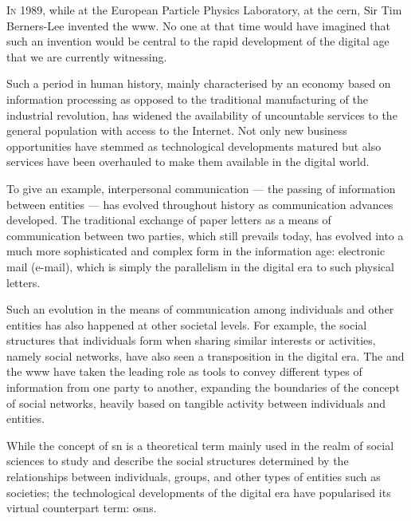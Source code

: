 

\lettrine{\textcolor[gray]{.25}{I}}{n} 1989, while at the European Particle Physics 
Laboratory, at the \acf{cern}, Sir Tim Berners-Lee invented the \Ac{www}. No one 
at that time would have imagined that such an invention would be central to the rapid 
development of the digital age that we are currently witnessing.

Such a period in human history, mainly characterised by an economy based on information 
processing as opposed to the traditional manufacturing of the industrial revolution, 
has widened the availability of uncountable services to the general population with 
access to the Internet. Not only new business opportunities have stemmed as technological 
developments matured but also services have been overhauled to make them available 
in the digital world.

To give an example, interpersonal communication --- the passing of information between 
entities --- has evolved throughout history as communication advances developed. 
The traditional exchange of paper letters as a means of communication between two 
parties, which still prevails today, has evolved into a much more sophisticated 
and complex form in the information age: electronic mail (e-mail), which is simply 
the parallelism in the digital era to such physical letters.

Such an evolution in the means of communication among individuals and other entities 
has also happened at other societal levels. For example, the social structures that 
individuals form when sharing similar interests or activities, namely social networks, 
have also seen a transposition in the digital era. The \Internet and the \ac{www} 
have taken the leading role as tools to convey different types of information from 
one party to another, expanding the boundaries of the concept of social networks, 
heavily based on tangible activity between individuals and entities.

While the concept of \acl{sn} is a theoretical term mainly used in the realm of 
social sciences to study and describe the social structures determined by the relationships 
between individuals, groups, and other types of entities such as societies; the 
technological developments of the digital era have popularised its virtual counterpart 
term: \aclp{osn}.

